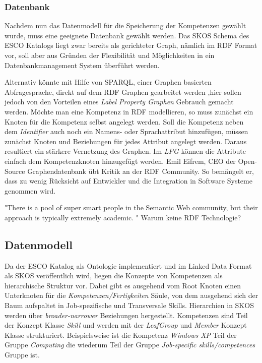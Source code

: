 \subsubsection{Datenbank}

Nachdem nun das Datenmodell für die Speicherung der Kompetenzen gewählt wurde, muss eine geeignete Datenbank gewählt werden. Das SKOS Schema des ESCO Katalogs liegt zwar bereits als gerichteter Graph, nämlich im RDF Format vor, soll aber aus Gründen der Flexibilität und Möglichkeiten in ein Datenbankmanagement System überführt werden.

Alternativ könnte mit Hilfe von SPARQL, einer Graphen basierten Abfragesprache, direkt auf dem RDF Graphen gearbeitet werden 
,hier sollen jedoch von den Vorteilen eines \textit{Label Property Graphen}  Gebrauch gemacht werden. Möchte man eine Kompetenz in RDF modellieren, so muss zunächst ein Knoten für die Kompetenz selbst angelegt werden. Soll die Kompetenz neben dem \textit{Identifier} auch noch ein Namens- oder Sprachattribut hinzufügen, müssen zunächst Knoten und Beziehungen für jedes Attribut angelegt werden. Daraus resultiert ein stärkere Vernetzung des Graphen. Im \textit{LPG} können die Attribute einfach dem Kompetenzknoten hinzugefügt werden. Emil Eifrem, CEO der Open-Source Graphendatenbank \cite{Neo4j} übt Kritik an der RDF Community. So bemängelt er, dass zu wenig Rücksicht auf Entwickler und die Integration in Software Systeme genommen wird. \cite{anadiotis_2017} 

"There is a pool of super smart people in the Semantic Web community, but their approach is typically extremely academic. "
Warum keine RDF Technologie?

\subsection{Datenmodell}

Da der ESCO Katalog als Ontologie implementiert und im Linked Data Format als SKOS veröffentlich wird, liegen die Konzepte von Kompetenzen als hierarchische Struktur vor. Dabei gibt es ausgehend vom Root Knoten einen Unterknoten für die \textit{Kompetenzen/Fertigkeiten} Säule, von dem ausgehend sich der Baum aufspaltet in Job-spezifische und Transversale Skills. Hierarchien in SKOS werden über \textit{broader-narrower} Beziehungen hergestellt. Kompetenzen sind Teil der Konzept Klasse \textit{Skill} und werden mit der \textit{LeafGroup} und \textit{Member} Konzept Klasse strukturiert. Beispielsweise ist die Kompetenz \textit{Windows XP} Teil der Gruppe \textit{Computing} die wiederum Teil der Gruppe \textit{Job-specific skills/competences} Gruppe ist.

